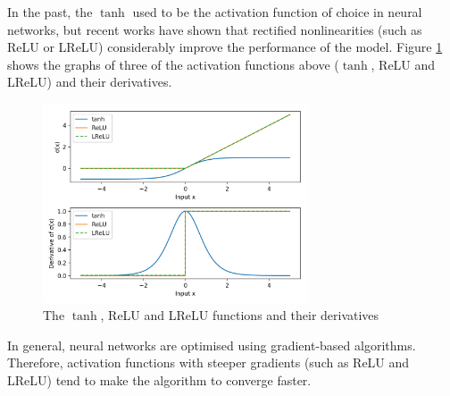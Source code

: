 	In the past, the $\tanh$ used to be the activation function of choice in neural networks, but recent works\cite{nonlinearities} have shown that rectified nonlinearities (such as ReLU or LReLU) considerably improve the performance of the model. Figure \ref{Fig: prep/ml/mlp/activations} shows the graphs of three of the activation functions above ($\tanh$, ReLU and LReLU) and their derivatives.
	\begin{figure}[H]
		\centering
		\includegraphics[width=0.7\textwidth]{graphics/nns/activations}
		
		\caption[Activation functions]{The $\tanh$, ReLU and LReLU functions and their derivatives}
		\label{Fig: prep/ml/mlp/activations}
	\end{figure}
	In general, neural networks are optimised using gradient-based algorithms. Therefore, activation functions with steeper gradients (such as ReLU and LReLU) tend to make the algorithm to converge faster.
	
